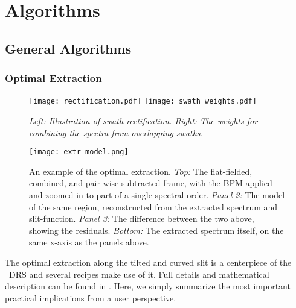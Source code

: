 \section{Algorithms}
\label{sec:algorithms}


\subsection{General Algorithms}
\label{sec:algorithms-general}

\subsubsection{Optimal Extraction}
\label{sec:extract}
\begin{figure}[ht]
    \begin{center}
\texttt{[image: rectification.pdf]}
\texttt{[image: swath\_weights.pdf]}
\end{center}
\caption{\it Left: Illustration of swath rectification. Right: The weights 
    for combining the spectra from overlapping swaths.}
\label{fig:swaths}
\end{figure}

\begin{figure}[ht]
    \begin{center}
\texttt{[image: extr\_model.png]}
\end{center}
\caption{An example of the optimal extraction. \emph{Top:} The flat-fielded,
combined, and pair-wise subtracted frame, with the BPM applied and zoomed-in to
part of a single spectral order. \emph{Panel 2:} The model of the same region,
reconstructed from the extracted spectrum and slit-function. \emph{Panel 3:} The
difference between the two above, showing the residuals. \emph{Bottom:} The
extracted spectrum itself, on the same x-axis as the panels above.}
\label{fig:extrmodel}
\end{figure}

The optimal extraction along the tilted and curved slit is a centerpiece of the
\instrument\ DRS and several recipes make use of it. Full details and
mathematical description can be found in \cite{2021A&A...646A..32P}. Here, we
simply summarize the most important practical implications from a user
perspective.

